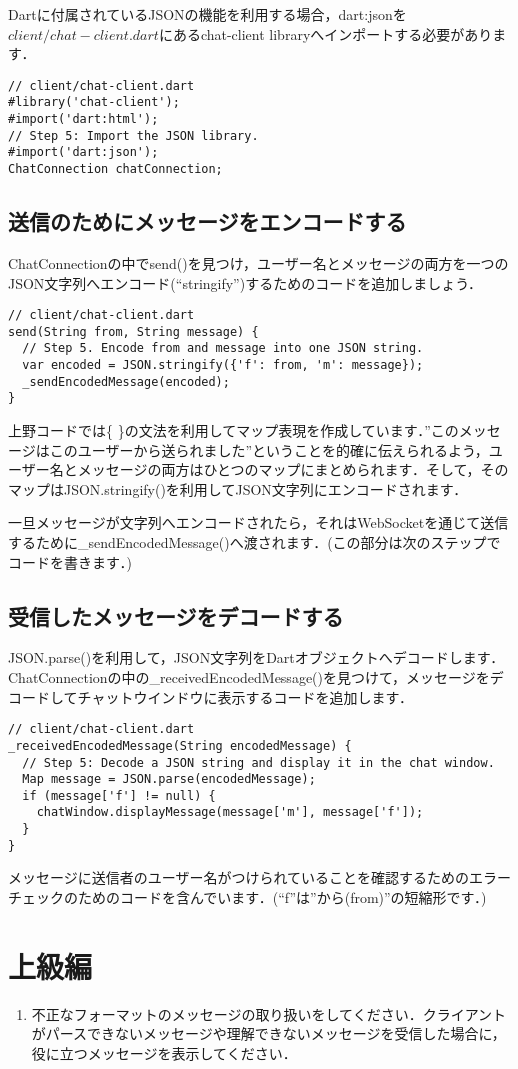 Dartに付属されているJSONの機能を利用する場合，dart:jsonを$ client/chat-client.dart $にあるchat-client libraryへインポートする必要があります．

\begin{verbatim}
// client/chat-client.dart
#library('chat-client');
#import('dart:html');
// Step 5: Import the JSON library.
#import('dart:json');
ChatConnection chatConnection;
\end{verbatim}

\subsection{送信のためにメッセージをエンコードする}

ChatConnectionの中でsend()を見つけ，ユーザー名とメッセージの両方を一つのJSON文字列へエンコード(``stringify'')するためのコードを追加しましょう．

\begin{verbatim}
// client/chat-client.dart
send(String from, String message) {
  // Step 5. Encode from and message into one JSON string.
  var encoded = JSON.stringify({'f': from, 'm': message});
  _sendEncodedMessage(encoded);
}
\end{verbatim}

上野コードでは\{ \}の文法を利用してマップ表現を作成しています．''このメッセージはこのユーザーから送られました''ということを的確に伝えられるよう，ユーザー名とメッセージの両方はひとつのマップにまとめられます．そして，そのマップはJSON.stringify()を利用してJSON文字列にエンコードされます．

一旦メッセージが文字列へエンコードされたら，それはWebSocketを通じて送信するために\_sendEncodedMessage()へ渡されます．(この部分は次のステップでコードを書きます．)

\subsection{受信したメッセージをデコードする}

JSON.parse()を利用して，JSON文字列をDartオブジェクトへデコードします．ChatConnectionの中の\_receivedEncodedMessage()を見つけて，メッセージをデコードしてチャットウインドウに表示するコードを追加します．

\begin{verbatim}
// client/chat-client.dart
_receivedEncodedMessage(String encodedMessage) {
  // Step 5: Decode a JSON string and display it in the chat window.
  Map message = JSON.parse(encodedMessage);
  if (message['f'] != null) {
    chatWindow.displayMessage(message['m'], message['f']);
  }
}
\end{verbatim}

メッセージに送信者のユーザー名がつけられていることを確認するためのエラーチェックのためのコードを含んでいます．(``f''は''から(from)''の短縮形です．)

\section{上級編}

\begin{enumerate}
\item 不正なフォーマットのメッセージの取り扱いをしてください．クライアントがパースできないメッセージや理解できないメッセージを受信した場合に，役に立つメッセージを表示してください．
\end{enumerate}
